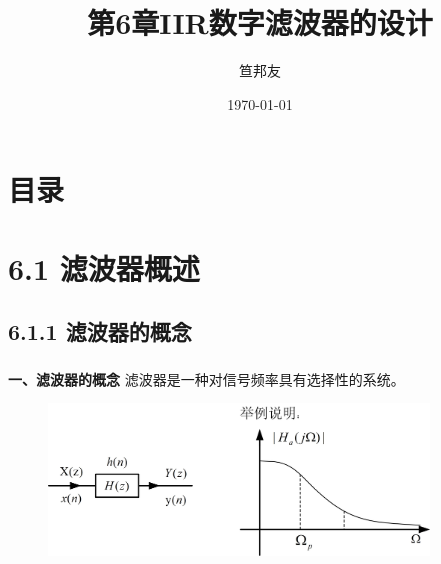 \documentclass[notheorems,compress,mathserif,table]{beamer}
\title{\heiti 第6章\quad  IIR数字滤波器的设计}
\author[\textcolor{blue}]{{\sihao\kaishu  笪邦友}}
\institute{\sihao\lishu  \textcolor{violet}{中南民族大学~~ 电子信息工程学院}}
\date{\fangsong\today}
\begin{document}
	\kaishu
	\frame{ \titlepage }
	\section*{目录}
	
\section{6.1 滤波器概述}

\subsection{6.1.1 滤波器的概念}
\begin{frame}\frametitle{}%
\textbf{一、滤波器的概念}
\newline
滤波器是一种对信号频率具有选择性的系统。
\begin{figure}[h]
  \centering
  \includegraphics[width=0.9\textwidth]{fig1_lvboqigainian.jpg}
\end{figure}
\end{frame}

%
\end{document}
